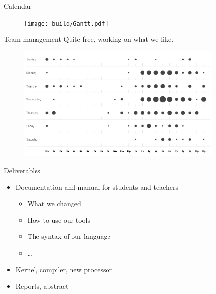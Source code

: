 \documentclass{beamer}
\begin{document}
      \begin{frame}{Calendar}
      \end{frame}

      \begin{frame}[plain]
        \begin{figure}
          \texttt{[image: build/Gantt.pdf]}
        \end{figure}
      \end{frame}

      \begin{frame}{Team management}
        Quite free, working on what we like.

        \begin{figure}
          \centering
          \includegraphics[width=0.9\textwidth]{fig/punchcard.png}
        \end{figure}
      \end{frame}

      \begin{frame}{Deliverables}
        \begin{itemize}
          \item Documentation and manual for students and teachers
            \begin{itemize}
              \item What we changed
              \item How to use our tools
              \item The syntax of our language
              \item \dots
            \end{itemize}
          \item Kernel, compiler, new processor
          \item Reports, abstract
        \end{itemize}
      \end{frame}
\end{document}
